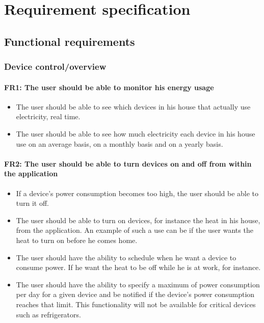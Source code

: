 \chapter{Requirement specification}
\section{Functional requirements}


\subsection{Device control/overview}
\subsubsection{FR1: The user should be able to monitor his energy usage}

\begin{itemize}
\item The user should be able to see which devices in his house that actually use electricity, real time.
\item The user should be able to see how much electricity each device in his house use on an average basis, on a monthly basis and on a yearly basis.
\end{itemize}

\subsubsection{FR2: The user should be able to turn devices on and off from within the application}
\begin{itemize}
\item If a device's power consumption becomes too high, the user should be able to turn it off.
\item The user should be able to turn on devices, for instance the heat in his house, from the application. An example of such a use can be if the user wants the heat to turn on before he comes home.
\item The user should have the ability to schedule when he want a device to consume power. If he want the heat to be off while he is at work, for instance. 
\item The user should have the ability to specify a maximum of power 
consumption per day for a given device and be notified if the device's power
consumption reaches that limit. This functionality will not be available
for critical devices such as refrigerators. 
\end{itemize}

